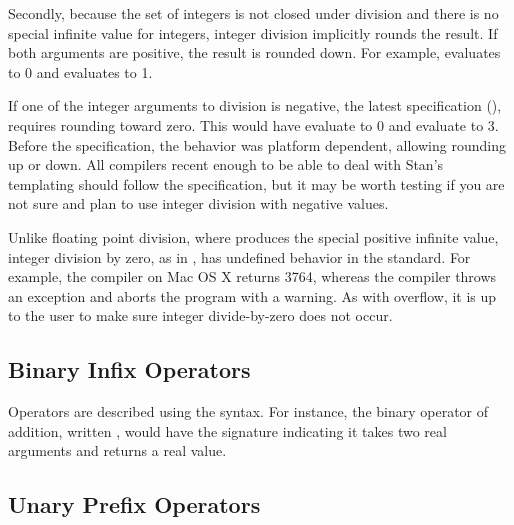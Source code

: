 Secondly, because the set of integers is not closed under division and
there is no special infinite value for integers, integer division
implicitly rounds the result.  If both arguments are positive, the
result is rounded down.  For example,  evaluates to 0 and
 evaluates to 1.  

If one of the integer arguments to division is negative, the latest
\Cpp specification (), requires rounding toward zero.  This
would have  evaluate to 0 and  evaluate to
3.  Before the  specification, the behavior was platform
dependent, allowing rounding up or down.  All compilers recent enough
to be able to deal with Stan's templating should follow the 
specification, but it may be worth testing if you are not sure and
plan to use integer division with negative values.

Unlike floating point division, where  produces the
special positive infinite value, integer division by zero, as in
, has undefined behavior in the \Cpp standard.  For
example, the \clang compiler on Mac OS X returns 3764, whereas the
\gpp compiler throws an exception and aborts the program with a
warning.  As with overflow, it is up to the user to make sure integer
divide-by-zero does not occur.

\subsection{Binary Infix Operators}

Operators are described using the \Cpp syntax.  For instance, the
binary operator of addition, written , would have the
\Stan signature  indicating it takes
two real arguments and returns a real value.

\begin{description}
%
%
%
%
%
\end{description}

\subsection{Unary Prefix Operators}

